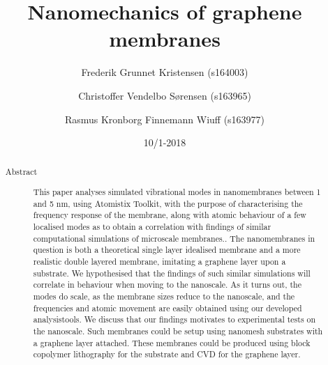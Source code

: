 \documentclass[aps, prb, a4paper, english, 12pt, twocolumn, longbibliography, amsmath, amssymb]{revtex4-1}
\begin{document}
\begin{abstract}
 \begin{description}
  \item[Abstract] This paper analyses simulated vibrational modes in nanomembranes between 1 and 5 nm, using Atomistix Toolkit\cite{QuantumWise}, with the purpose of characterising the frequency response of the membrane, along with atomic behaviour of a few localised modes as to obtain a correlation with findings of similar computational simulations of microscale membranes.\cite{Davidovikj2016}. The nanomembranes in question is both a theoretical single layer idealised membrane and a more realistic double layered membrane, imitating a graphene layer upon a substrate. We hypothesised that the findings of such similar simulations will correlate in behaviour when moving to the nanoscale.
  As it turns out, the modes do scale, as the membrane sizes reduce to the nanoscale, and the frequencies and atomic movement are easily obtained using our developed analysistools. We discuss that our findings motivates to experimental tests on the nanoscale. Such membranes could be setup using nanomesh substrates with a graphene layer attached. These membranes could be produced using block copolymer lithography for the substrate and CVD for the graphene layer.
 \end{description}
\end{abstract}

\title{Nanomechanics of graphene membranes}
\date{10/1-2018}
\author{Frederik Grunnet Kristensen (s164003)}
\author{Christoffer Vendelbo Sørensen (s163965)}
\author{Rasmus Kronborg Finnemann Wiuff (s163977)}

\maketitle


\tableofcontents

\makeatletter
\let\toc@pre\relax
\let\toc@post\relax
\makeatother
\end{document}

